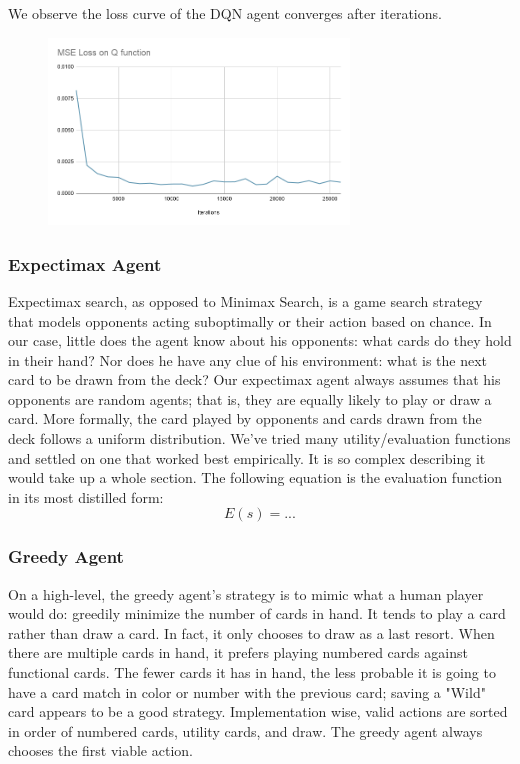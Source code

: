 \documentclass{article}
\begin{document}
We observe the loss curve of the DQN agent converges after \todo{} iterations. 
\begin{figure}
    \begin{center}
    \includegraphics[width=8cm]{MSE Loss on Q function.png}
    \end{center}
    \label{fig:loss}
\end{figure}


\subsubsection{Expectimax Agent}
Expectimax search, as opposed to Minimax Search, is a game search strategy that models opponents acting suboptimally or their action based on chance. In our case, little does the agent know about his opponents: what cards do they hold in their hand? Nor does he have any clue of his environment: what is the next card to be drawn from the deck? Our expectimax agent always assumes that his opponents are random agents; that is, they are equally likely to play or draw a card. More formally, the card played by opponents and cards drawn from the deck follows a uniform distribution. We've tried many utility/evaluation functions and settled on one that worked best empirically. It is so complex describing it would take up a whole section. The following equation is the evaluation function in its most distilled form:
\begin{equation}
    E(s) = ...
\end{equation}


\subsubsection{Greedy Agent}
On a high-level, the greedy agent's strategy is to mimic what a human player would do: greedily minimize the number of cards in hand. It tends to play a card rather than draw a card. In fact, it only chooses to draw as a last resort. When there are multiple cards in hand, it prefers playing numbered cards against functional cards. The fewer cards it has in hand, the less probable it is going to have a card match in color or number with the previous card; saving a "Wild" card appears to be a good strategy. Implementation wise, valid actions are sorted in order of numbered cards, utility cards, and draw. The greedy agent always chooses the first viable action. 
\end{document}
